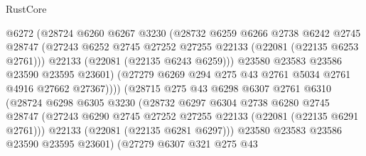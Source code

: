 \begin{lexlean}{RustCore}
\begin{coremodule}
                              @6272
                              (@28724
                                @6260
                                @6267
                                @3230
                                (@28732
                                  @6259
                                  @6266
                                  @2738
                                  @6242
                                  @2745
                                  @28747
                                  (@27243
                                    @6252
                                    @2745
                                    @27252
                                    @27255
                                    @22133
                                    (@22081 (@22135 @6253 @2761)))
                                  @22133
                                  (@22081 (@22135 @6243 @6259)))
                                @23580
                                @23583
                                @23586
                                @23590
                                @23595
                                @23601)
                              (@27279 @6269 @294 @275 @43 @2761 @5034 @2761 @4916 @27662 @27367))))
                        (@28715
                          @275
                          @43
                          @6298
                          @6307
                          @2761
                          @6310
                          (@28724
                            @6298
                            @6305
                            @3230
                            (@28732
                              @6297
                              @6304
                              @2738
                              @6280
                              @2745
                              @28747
                              (@27243
                                @6290
                                @2745
                                @27252
                                @27255
                                @22133
                                (@22081 (@22135 @6291 @2761)))
                              @22133
                              (@22081 (@22135 @6281 @6297)))
                            @23580
                            @23583
                            @23586
                            @23590
                            @23595
                            @23601)
                          (@27279
                            @6307
                            @321
                            @275
                            @43

\end{coremodule}
\end{lexlean}

